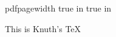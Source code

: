 \newif\ifknuthtex
\expandafter\ifx\csname pdfpagewidth\endcsname\relax
\knuthtextrue
\else
{} true in
 true in
\fi

This is \ifknuthtex Knuth's \TeX\else pdfTeX\fi
\bye
